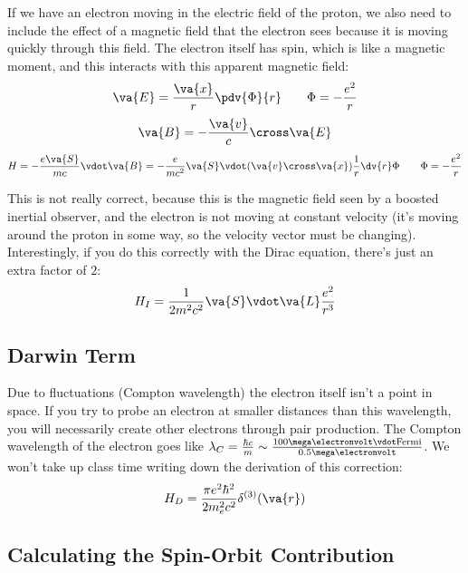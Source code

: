 \documentclass[a4paper,twoside,master.tex]{subfiles}
\begin{document}
If we have an electron moving in the electric field of the proton, we also need to include the effect of a magnetic field that the electron sees because it is moving quickly through this field. The electron itself has spin, which is like a magnetic moment, and this interacts with this apparent magnetic field:
\begin{equation}
    \va{E} = \frac{\va{x}}{r} \pdv{\Phi}{r} \qquad \Phi = - \frac{e^2}{r}
\end{equation}
\begin{equation}
    \va{B} = - \frac{\va{v}}{c} \cross \va{E}
\end{equation}
\begin{equation}
    H = - \frac{e \va{S}}{mc} \vdot \va{B} = - \frac{e}{mc^2} \va{S} \vdot (\va{v} \cross \va{x}) \frac{1}{r} \dv{r} \Phi \qquad \Phi = - \frac{e^2}{r}
\end{equation}

This is not really correct, because this is the magnetic field seen by a boosted inertial observer, and the electron is not moving at constant velocity (it's moving around the proton in some way, so the velocity vector must be changing). Interestingly, if you do this correctly with the Dirac equation, there's just an extra factor of $ 2 $:
\begin{equation}
    H_I = \frac{1}{2m^2 c^2} \va{S} \vdot \va{L} \frac{e^2}{r^3}
\end{equation}

\subsection{Darwin Term}
\label{sub:darwin_term}

Due to fluctuations (Compton wavelength) the electron itself isn't a point in space. If you try to probe an electron at smaller distances than this wavelength, you will necessarily create other electrons through pair production. The Compton wavelength of the electron goes like $ \lambda_C = \frac{\hbar c}{m} \sim \frac{100 \mega\electronvolt \vdot \text{Fermi}}{0.5 \mega\electronvolt}$. We won't take up class time writing down the derivation of this correction:
\begin{equation}
    H_D = \frac{\pi e^2 \hbar^2}{2 m_e^2 c^2} \delta^{(3)}(\va{r})
\end{equation}

\subsection{Calculating the Spin-Orbit Contribution}
\label{sub:calculating_the_spin-orbit_contribution}
\end{document}
